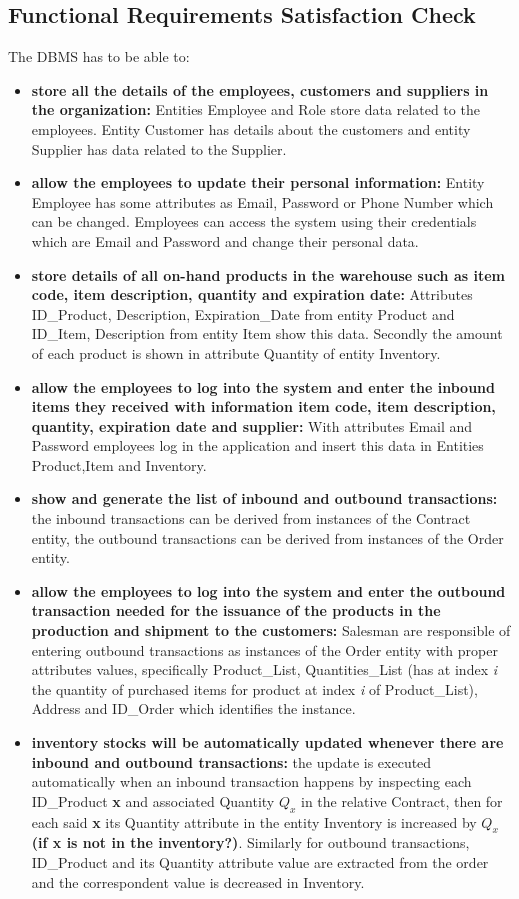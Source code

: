\subsection{Functional Requirements Satisfaction Check}

The DBMS has to be able to:
\begin{itemize}
	\item \textbf{store all the details of the employees, customers and suppliers in the organization:} Entities Employee and Role store data related to the employees. Entity Customer has details about the customers and entity Supplier has data related to the Supplier.
	\item \textbf{allow the employees to update their personal information:} Entity Employee has some attributes as Email, Password or Phone Number which can be changed. Employees can access the system using their credentials which are Email and Password and change their personal data.
	\item \textbf{store details of all on-hand products in the warehouse such as item code, item description, quantity and expiration date:} Attributes ID\_Product, Description, Expiration\_Date from entity Product and ID\_Item, Description from entity Item show this data. Secondly the amount of each product is shown in attribute Quantity of entity Inventory.  
	\item \textbf{allow the employees to log into the system and enter the inbound items they received with information item code, item description, quantity, expiration date and supplier:} With attributes Email and Password employees log in the application and insert this data in Entities Product,Item and Inventory.
	\item \textbf{show and generate the list of inbound and outbound transactions:} the inbound transactions can be derived from instances of the Contract entity, the outbound transactions can be derived from instances of the Order entity.
	\item \textbf{allow the employees to log into the system and enter the outbound transaction needed for the issuance of the products in the production and shipment to the customers:} Salesman are responsible of entering outbound transactions as instances of the Order entity with proper attributes values, specifically Product\_List, Quantities\_List (has at index \textit{i} the quantity of purchased items for product at index \textit{i} of Product\_List), Address and ID\_Order which identifies the instance.
\item \textbf{inventory stocks will be automatically updated whenever there are inbound and outbound transactions:} the update is executed automatically when an inbound transaction happens by inspecting each ID\_Product \textbf{x} and associated Quantity \(Q_x\) in the relative Contract, then for each said \textbf{x} its Quantity attribute in the entity Inventory is increased by  \(Q_x\) \textbf{(if x is not in the inventory?)}. Similarly for outbound transactions, ID\_Product and its Quantity attribute value are extracted from the order and the correspondent value is decreased in Inventory.

\end{itemize}
